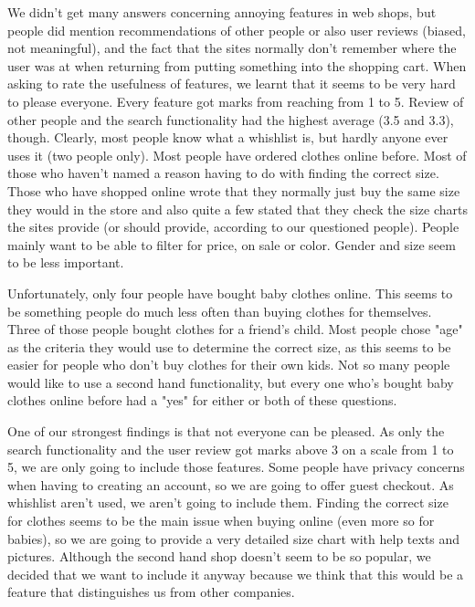 We didn't get many answers concerning annoying features in web shops, but people did mention recommendations of other people or also user reviews (biased, not meaningful), and the fact that the sites normally don't remember where the user was at when returning from putting something into the shopping cart. When asking to rate the usefulness of features, we learnt that it seems to be very hard to please everyone. Every feature got marks from reaching from 1 to 5. Review of other people and the search functionality had the highest average (3.5 and 3.3), though. Clearly, most people know what a whishlist is, but hardly anyone ever uses it (two people only). Most people have ordered clothes online before. Most of those who haven't named a reason having to do with finding the correct size. Those who have shopped online wrote that they normally just buy the same size they would in the store and also quite a few stated that they check the size charts the sites provide (or should provide, according to our questioned people).
People mainly want to be able to filter for price, on sale or color. Gender and size seem to be less important. 

Unfortunately, only four people have bought baby clothes online. This seems to be something people do much less often than buying clothes for themselves. Three of those people bought clothes for a friend's child. Most people chose "age" as the criteria they would use to determine the correct size, as this seems to be easier for people who don't buy clothes for their own kids. Not so many people would like to use a second hand functionality, but every one who's bought baby clothes online before had a "yes" for either or both of these questions. 

One of our strongest findings is that not everyone can be pleased. As only the search functionality and the user review got marks above 3 on a scale from 1 to 5, we are only going to include those features. Some people have privacy concerns when having to creating an account, so we are going to offer guest checkout. As whishlist aren't used, we aren't going to include them. Finding the correct size for clothes seems to be the main issue when buying online (even more so for babies), so we are going to provide a very detailed size chart with help texts and pictures. Although the second hand shop doesn't seem to be so popular, we decided that we want to include it anyway because we think that this would be a feature that distinguishes us from other companies. 

